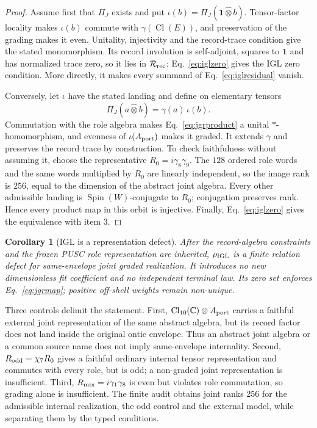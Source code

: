 \documentclass[11pt,a4paper]{article}
\newtheorem{corollary}[definition]{Corollary}
\theoremstyle{remark}
\newcommand{\id}{\mathbf 1}
\begin{document}
\begin{proof}
Assume first that $\Pi_J$ exists and put
$\iota(b)=\Pi_J(\id\widehat\otimes b)$.  Tensor-factor locality makes
$\iota(b)$ commute with $\gamma(\operatorname{Cl}(E))$, and preservation of
the grading makes it even.  Unitality, injectivity and the record-trace
condition give the stated monomorphism.  Its record involution is
self-adjoint, squares to $\id$ and has normalized trace zero, so it lies in
$\mathcal R_{\rm rec}$; Eq.~\eqref{eq:iglzero} gives the IGL zero condition.
More directly, it makes
every summand of Eq.~\eqref{eq:iglresidual} vanish.

Conversely, let $\iota$ have the stated landing and define on elementary
tensors
\begin{equation}
 \Pi_J(a\widehat\otimes b)=\gamma(a)\,\iota(b).
 \label{eq:jgrproduct}
\end{equation}
Commutation with the role algebra makes Eq.~\eqref{eq:jgrproduct} a unital
$*$-homomorphism, and evenness of $\iota(A_{\rm port})$ makes it graded.  It
extends $\gamma$ and preserves the record trace by construction.  To check
faithfulness without assuming it, choose the representative
$R_0=i\gamma_8\gamma_9$.  The $128$ ordered role words and the same words
multiplied by $R_0$ are linearly independent, so the image rank is $256$,
equal to the dimension of the abstract joint algebra.  Every other admissible
landing is $\operatorname{Spin}(W)$-conjugate to $R_0$; conjugation preserves
rank.  Hence every product map in this orbit is injective.  Finally,
Eq.~\eqref{eq:iglzero} gives the equivalence with item 3.
\end{proof}

\begin{corollary}[IGL is a representation defect]
After the record-algebra constraints and the frozen PUSC role representation
are inherited, $\rho_{\rm IGL}$ is a finite relation defect for
same-envelope joint graded realization.  It introduces no new dimensionless
fit coefficient and no independent terminal law.  Its zero set enforces
Eq.~\eqref{eq:jgrmap}; positive off-shell weights remain non-unique.
\end{corollary}

Three controls delimit the statement.  First,
$\operatorname{Cl}_{10}(\mathbb C)\otimes A_{\rm port}$ carries a faithful
external joint representation of the same abstract algebra, but its record
factor does not land inside the original ontic envelope.  Thus an abstract
joint algebra or a common source name does not imply same-envelope
internality.  Second, $R_{\rm odd}=\chi_7R_0$ gives a faithful ordinary
internal tensor representation and commutes with every role, but is odd; a
non-graded joint representation is insufficient.  Third,
$R_{\rm mix}=i\gamma_1\gamma_8$ is even but violates role commutation, so
grading alone is insufficient.  The finite audit obtains joint ranks $256$
for the admissible internal realization, the odd control and the external
model, while separating them by the typed conditions.
\end{document}
